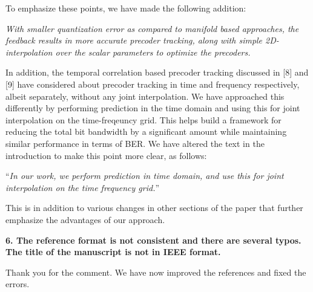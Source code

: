 \documentclass[12pt]{letter}
\begin{document}
To emphasize these points, we have made the following addition:

\emph{With smaller
quantization error as compared to manifold based approaches, the
feedback results in more accurate precoder tracking, along with simple
2D-interpolation over the scalar parameters to optimize the precoders.}


In addition, the temporal correlation based precoder tracking
discussed in [8] and [9] have considered about precoder tracking in
time and frequency respectively, albeit separately, without any joint
interpolation.  We have approached this differently by performing
prediction in the time domain and using this for joint interpolation
on the time-freqeuncy grid. This helps build a framework for reducing
the total bit bandwidth by a significant amount while maintaining
similar performance in terms of BER.  We have altered the text in the
introduction to make this point more clear, as follows:

``\emph{In our work, we perform prediction in time domain, and use this for joint
  interpolation on the time frequency grid.}''

This is in addition to various changes in other sections of the paper
that further emphasize the advantages of our approach.


\textbf{6. The reference format is not consistent and there are
  several typos. The title of the manuscript is not in IEEE format.}

Thank you for the comment. We have now improved the references and
fixed the errors.
\end{document}
